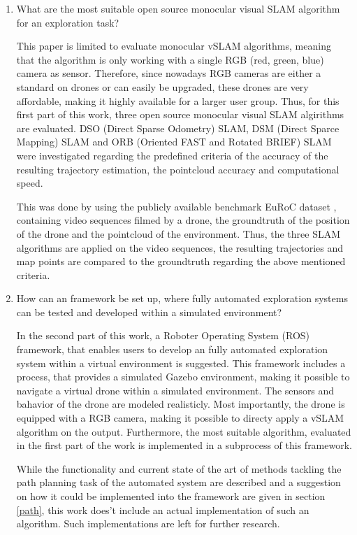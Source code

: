  \begin{enumerate}
 \item{What are the most suitable open source monocular visual SLAM algorithm for an exploration task?}
 
 
  This paper is limited to evaluate monocular vSLAM algorithms, meaning that the algorithm is only working
 with a single RGB (red, green, blue) camera as sensor. Therefore, since nowadays RGB cameras are either a standard on drones or can easily be upgraded,
 these drones are very affordable, making it highly available for a larger user group. 
 Thus, for this first part of this work, three open source monocular visual SLAM algirithms are evaluated. 
  DSO (Direct Sparse Odometry) SLAM, DSM (Direct Sparce Mapping) SLAM and ORB (Oriented FAST and Rotated BRIEF)
 SLAM were investigated regarding the predefined criteria of the accuracy of the resulting trajectory estimation, the pointcloud accuracy and computational speed. 
 
 This was done by using the publicly available benchmark EuRoC dataset \cite{euroc}, containing video sequences filmed by a drone, the 
 groundtruth of the position of the drone and the pointcloud of the environment. Thus, the three SLAM algorithms are applied on the 
 video sequences, the resulting trajectories and map points are compared to the groundtruth regarding the above mentioned criteria.

 \item{How can an framework be set up, where fully automated exploration systems can be tested and developed within a simulated environment?}
 
 In the second part of this work, a Roboter Operating System (ROS) framework, that enables users to develop an fully automated exploration system within 
 a virtual environment is suggested. This framework includes a process, that provides a simulated Gazebo environment, making it possible to navigate 
 a virtual drone within a simulated environment. The sensors and bahavior of the drone are modeled realisticly. Most importantly, the drone is equipped with a RGB 
 camera, making it possible to directy apply a vSLAM algorithm on the output. 
 Furthermore, the most suitable algorithm, evaluated in the first part of the work is implemented in a subprocess of this framework. 
 
 While the functionality and current state of the art of methods tackling the path planning task of the automated system are described and a suggestion on how it could 
 be implemented into the framework are given in section \ref{path}, this work does't include an actual implementation of such an algorithm. 
 Such implementations are left for further research. 
 

\end{enumerate}

